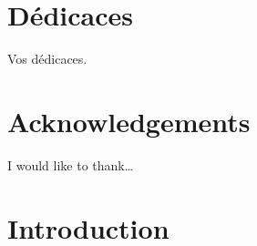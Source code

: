 \documentclass[12pt,maitrise,nobabel,anglais,twoside,initial]{template/dms}
\numberwithin{equation}{section}
\numberwithin{table}{chapter}
\numberwithin{figure}{chapter}
\begin{document}
\chapter*{D\protect\'edicaces}

\vspace{2cm}
\hspace{2.5cm}Vos d\'edicaces.

\chapter*{Acknowledgements} %

\noindent I would like to thank\ldots



\NoChapterPageNumber 
\cleardoublepage



\chapter*{Introduction}





\




% 
\end{document}
